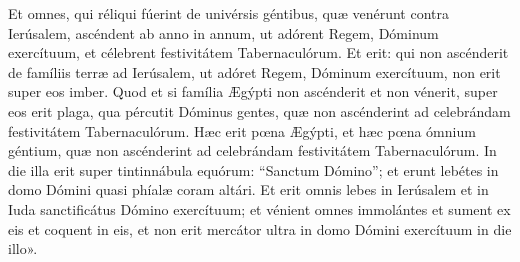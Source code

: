 {\noindent Et omnes, qui réliqui fúerint de univérsis géntibus, quæ venérunt contra Ierúsalem, ascéndent ab anno in annum, ut adórent Regem, Dóminum exercítuum, et célebrent festivitátem Tabernaculórum. Et erit: qui non ascénderit de famíliis terræ ad Ierúsalem, ut adóret Regem, Dóminum exercítuum, non erit super eos imber. Quod et si família Ægýpti non ascénderit et non vénerit, super eos erit plaga, qua pércutit Dóminus gentes, quæ non ascénderint ad celebrándam festivitátem Tabernaculórum. Hæc erit pœna Ægýpti, et hæc pœna ómnium géntium, quæ non ascénderint ad celebrándam festivitátem Tabernaculórum. In die illa erit super tintinnábula equórum: “Sanctum Dómino”; et erunt lebétes in domo Dómini quasi phíalæ coram altári. Et erit omnis lebes in Ierúsalem et in Iuda sanctificátus Dómino exercítuum; et vénient omnes immolántes et sument ex eis et coquent in eis, et non erit mercátor ultra in domo Dómini exercítuum in die illo».}

